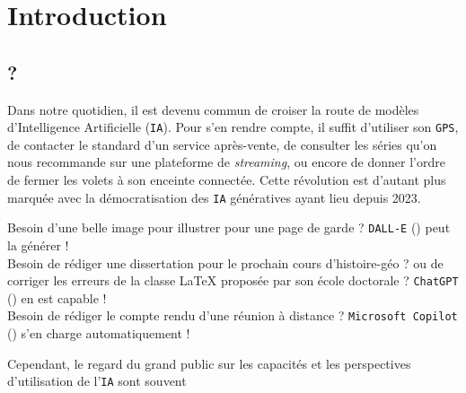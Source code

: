 \chapter{Introduction}
\label{chapter:1-INTRODUCTION}


	\section*{?}
	\label{section:1.1-INTRODUCTION-}
		
		
		Dans notre quotidien, il est devenu commun de croiser la route de modèles d'Intelligence Artificielle (\texttt{IA}).
		Pour s'en rendre compte, il suffit d'utiliser son \texttt{GPS}, de contacter le standard d'un service après-vente, de consulter les séries qu'on nous recommande sur une plateforme de \textit{streaming}, ou encore de donner l'ordre de fermer les volets à son enceinte connectée.
		Cette révolution est d'autant plus marquée avec la démocratisation des \texttt{IA} génératives ayant lieu depuis 2023.
		
		\begin{leftBarImportantGray}
			Besoin d'une belle image pour illustrer pour une page de garde ? \texttt{DALL-E} (\cite{ramesh-etal:2021:zeroshot-texttoimage-generation}) peut la générer ! \\
			Besoin de rédiger une dissertation pour le prochain cours d'histoire-géo ? ou de corriger les erreurs de la classe \LaTeX{} proposée par son école doctorale ? \texttt{ChatGPT} (\cite{openai:2023:chatgpt}) en est capable ! \\
			Besoin de rédiger le compte rendu d'une réunion à distance ? \texttt{Microsoft Copilot} (\cite{microsoft-corporation:2023:microsoft-copilot}) s'en charge automatiquement !
		\end{leftBarImportantGray}
		
		
		Cependant, le regard du grand public sur les capacités et les perspectives d'utilisation de l'\texttt{IA} sont souvent 
		
		
